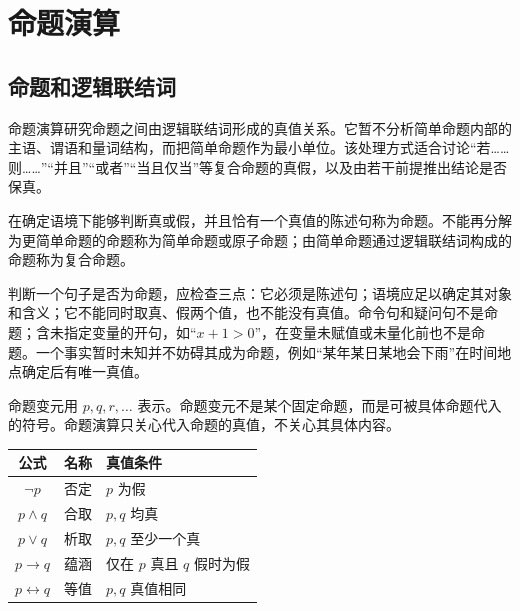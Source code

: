 %
%

\chapter{命题演算}

\section{命题和逻辑联结词}

命题演算研究命题之间由逻辑联结词形成的真值关系。它暂不分析简单命题内部的主语、谓语和量词结构，而把简单命题作为最小单位。该处理方式适合讨论“若……则……”“并且”“或者”“当且仅当”等复合命题的真假，以及由若干前提推出结论是否保真。

\begin{definition}[命题、简单命题与复合命题]\label{ch1-proposition}
在确定语境下能够判断真或假，并且恰有一个真值的陈述句称为命题。不能再分解为更简单命题的命题称为简单命题或原子命题；由简单命题通过逻辑联结词构成的命题称为复合命题。
\end{definition}

判断一个句子是否为命题，应检查三点：它必须是陈述句；语境应足以确定其对象和含义；它不能同时取真、假两个值，也不能没有真值。命令句和疑问句不是命题；含未指定变量的开句，如“$x+1>0$”，在变量未赋值或未量化前也不是命题。一个事实暂时未知并不妨碍其成为命题，例如“某年某日某地会下雨”在时间地点确定后有唯一真值。

命题变元用 $p,q,r,\ldots$ 表示。命题变元不是某个固定命题，而是可被具体命题代入的符号。命题演算只关心代入命题的真值，不关心其具体内容。

\begin{center}
\begin{tabular}{ccl}
\toprule
公式 & 名称 & 真值条件\\
\midrule
$\neg p$ & 否定 & $p$ 为假\\
$p\land q$ & 合取 & $p,q$ 均真\\
$p\lor q$ & 析取 & $p,q$ 至少一个真\\
$p\to q$ & 蕴涵 & 仅在 $p$ 真且 $q$ 假时为假\\
$p\leftrightarrow q$ & 等值 & $p,q$ 真值相同\\
\bottomrule
\end{tabular}
\end{center}

